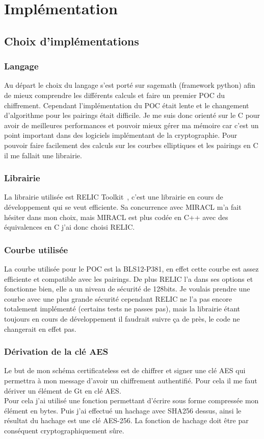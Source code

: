 \chapter{Implémentation}
\label{ch:impl}

\section{Choix d'implémentations}
\subsection{Langage}
Au départ le choix du langage s'est porté sur sagemath (framework python) afin de mieux comprendre les différents calculs et faire un premier POC du chiffrement.
Cependant l'implémentation du POC était lente et le changement d'algorithme pour les pairings était difficile.
Je me suis donc orienté sur le C pour avoir de meilleures performances et pouvoir mieux gérer ma mémoire car c'est un point important dans des logiciels implémentant de la cryptographie. Pour pouvoir faire facilement des calculs sur les courbes elliptiques et les pairings en C il me fallait une librairie.
\subsection{Librairie}
La librairie utilisée est RELIC Toolkit~\cite{relic-toolkit}, c'est une librairie en cours de développement qui se veut efficiente. Sa concurrence avec MIRACL m'a fait hésiter dans mon choix, mais MIRACL est plus codée en C++ avec des équivalences en C j'ai donc choisi RELIC.
\subsection{Courbe utilisée}
La courbe utilisée pour le POC est la BLS12-P381, en effet cette courbe est assez efficiente et compatible avec les pairings. De plus RELIC l'a dans ses options et fonctionne bien, elle a un niveau de sécurité de 128bits. Je voulais prendre une courbe avec une plus grande sécurité cependant RELIC ne l'a pas encore totalement implémenté (certains tests ne passes pas), mais la librairie étant toujours en cours de développement il faudrait suivre ça de près, le code ne changerait en effet pas.
\subsection{Dérivation de la clé AES}
Le but de mon schéma certificateless est de chiffrer et signer une clé AES qui permettra à mon message d'avoir un chiffrement authentifié. Pour cela il me faut dériver un élément de Gt en clé AES.\\
Pour cela j'ai utilisé une fonction permettant d'écrire sous forme compressée mon élément en bytes. Puis j'ai effectué un hachage avec SHA256 dessus, ainsi le résultat du hachage est une clé AES-256. La fonction de hachage doit être par conséquent cryptographiquement sûre.
